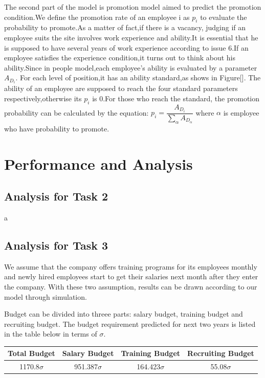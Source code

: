 \documentclass[12pt,a4paper,titlepage]{article}
\begin{document}
The second part of the model is promotion model aimed to predict the
promotion condition.We define the promotion rate of an employee i as
$p_i$ to evaluate the probability to promote.As a matter of fact,if
there is a vacancy, judging if an employee suits the site involves
work experience and ability.It is essential that he is supposed to
have several years of work experience according to issue 6.If an
employee satisfies the experience condition,it turns out to think
about his ability.Since in people model,each employee's ability is
evaluated by a parameter $A_{D_i}$. For each level of position,it has
an ability standard,as shows in Figure[]. The ability of an employee
are supposed to reach the four standard parameters
respectively,otherwise its $p_i$ is 0.For those who reach the
standard, the promotion probability can be calculated by the equation:
$p_i =\dfrac{A_{D_i}}{\sum_{\alpha} A_{D_\alpha}}$ where $\alpha$ is
employee who have probability to promote.

\section{Performance and Analysis}
\label{sec:performance-and-analysis}

\subsection{Analysis for Task 2}
\label{sec:analysis-for-task-2}

a

\subsection{Analysis for Task 3}
\label{sec:analysis-for-task-3}

We assume that the company offers training programs for its employees monthly and newly hired employees start to get their salaries next month after they enter the company. With these two assumption, results can be drawn according to our model through simulation.

Budget can be divided into threee parts: salary budget, training budget and recruiting budget. The budget requirement predicted for next two years is listed in the table below in terms of $\sigma$.

\begin{tabular}{*{4}{c}}\toprule[2pt]
Total Budget & Salary Budget & Training Budget & Recruiting Budget\\ \midrule
1170.8$\sigma$ & 951.387$\sigma$ & 164.423$\sigma$ & 55.08$\sigma$ \\ \bottomrule[2pt]
\end{tabular}
\end{document}
